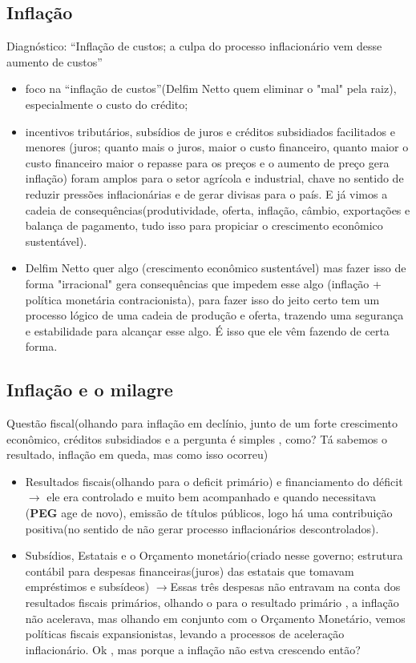 \documentclass[a4paper,12pt]{article}[abntex2]
\begin{document}
\subsection{\textbf{Inflação}}
Diagnóstico: “Inflação de custos; a culpa do processo inflacionário vem desse aumento de custos”\begin{itemize}
    \item foco na “inflação de custos”(Delfim Netto quem eliminar o "mal" pela raiz), especialmente o custo do crédito;
    \item incentivos tributários, subsídios de juros e créditos subsidiados facilitados e menores (juros; quanto mais o juros, maior o custo financeiro, quanto maior o custo financeiro maior o repasse para os preços e o aumento de preço gera inflação) foram amplos para o setor agrícola e industrial, chave no sentido de reduzir pressões inflacionárias e de gerar divisas para o país. E já vimos a cadeia de consequências(produtividade, oferta, inflação, câmbio, exportações e balança de pagamento, tudo isso para propiciar o crescimento econômico sustentável).
    \item Delfim Netto quer algo (crescimento econômico sustentável) mas fazer isso de forma "irracional" gera consequências que impedem esse algo (inflação + política monetária contracionista), para fazer isso do jeito certo tem um processo lógico de uma cadeia de produção e oferta, trazendo uma segurança e estabilidade para alcançar esse algo. É isso que ele vêm fazendo de certa forma.
\end{itemize}

\subsection{\textbf{Inflação e o milagre}}
Questão fiscal(olhando para inflação em declínio, junto de um forte crescimento econômico, créditos subsidiados e a pergunta é simples , como? Tá sabemos o resultado, inflação em queda, mas como isso ocorreu)\begin{itemize}
    \item Resultados fiscais(olhando para o deficit primário) e financiamento do déficit \(\rightarrow\) ele era controlado e muito bem acompanhado e quando necessitava (\textbf{PEG} age de novo), emissão de títulos públicos, logo há uma contribuição positiva(no sentido de não gerar processo inflacionários descontrolados). 
    \item Subsídios, Estatais e o Orçamento monetário(criado nesse governo; estrutura contábil para despesas financeiras(juros) das estatais que tomavam empréstimos e subsídeos) \(\rightarrow\)Essas três despesas não entravam na conta dos resultados fiscais primários, olhando o para o resultado primário , a inflação não acelerava, mas olhando em conjunto com o Orçamento Monetário, vemos políticas fiscais expansionistas, levando a processos de aceleração inflacionário. Ok , mas porque a inflação não estva crescendo então?
\end{itemize}
\end{document}
